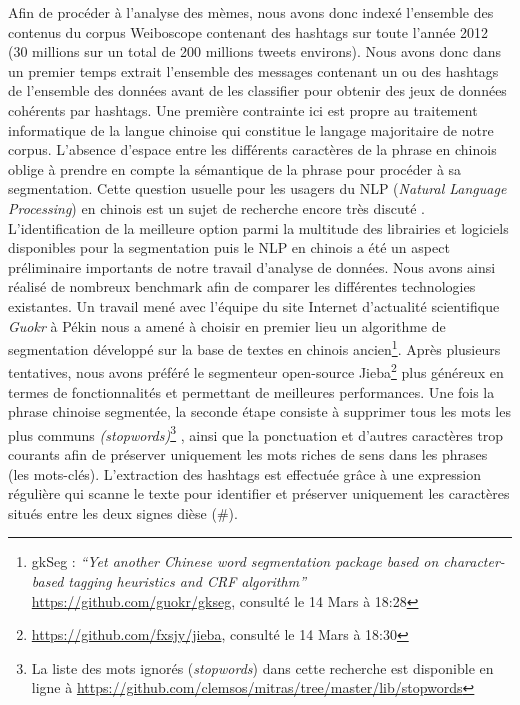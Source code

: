 Afin de procéder à l{\textquoteright}analyse des mèmes, nous avons donc indexé l{\textquoteright}ensemble des contenus du corpus Weiboscope contenant des hashtags sur toute l{\textquoteright}année 2012 (30 millions sur un total de 200 millions tweets environs). Nous avons donc dans un premier temps extrait l{\textquoteright}ensemble des messages contenant un ou des hashtags de l{\textquoteright}ensemble des données avant de les classifier pour obtenir des jeux de données cohérents par hashtags. Une première contrainte ici est propre au traitement informatique de la langue chinoise qui constitue le langage majoritaire de notre corpus. L{\textquoteright}absence d{\textquoteright}espace entre les différents caractères de la phrase en chinois oblige à prendre en compte la sémantique de la phrase pour procéder à sa segmentation. Cette question usuelle pour les usagers du NLP (\textit{Natural Language Processing}) en chinois est un sujet de recherche encore très discuté \citep{Qiu2013}. L{\textquoteright}identification de la meilleure option parmi la multitude des librairies et logiciels disponibles pour la segmentation puis le NLP en chinois a été un aspect préliminaire importants de notre travail d{\textquoteright}analyse de données. Nous avons ainsi réalisé de nombreux benchmark afin de comparer les différentes technologies existantes. Un travail mené avec l{\textquoteright}équipe du site Internet d{\textquoteright}actualité scientifique \textit{Guokr }à Pékin nous a amené à choisir en premier lieu un algorithme de segmentation développé sur la base de textes en chinois ancien\footnote{ gkSeg : \textit{{\textquotedblleft}Yet another Chinese word segmentation package based on character-based tagging heuristics and CRF algorithm{\textquotedblright} }\url{https://github.com/guokr/gkseg}, consulté le 14 Mars à 18:28}. Après plusieurs tentatives, nous avons préféré le segmenteur open-source Jieba\footnote{ \url{https://github.com/fxsjy/jieba}, consulté le 14 Mars à 18:30} plus généreux en termes de fonctionnalités et permettant de meilleures performances. Une fois la phrase chinoise segmentée, la seconde étape consiste à supprimer tous les mots les plus communs \textit{(stopwords)}\footnote{
    La liste des mots ignorés (\textit{stopwords}) dans cette recherche est disponible en ligne à \url{https://github.com/clemsos/mitras/tree/master/lib/stopwords}
}
, ainsi que la ponctuation et d{\textquoteright}autres caractères trop courants afin de préserver uniquement les mots riches de sens dans les phrases (les mots-clés). L{\textquoteright}extraction des hashtags est effectuée gr\^ace à une expression régulière qui scanne le texte pour identifier et préserver uniquement les caractères situés entre les deux signes dièse (\#).


